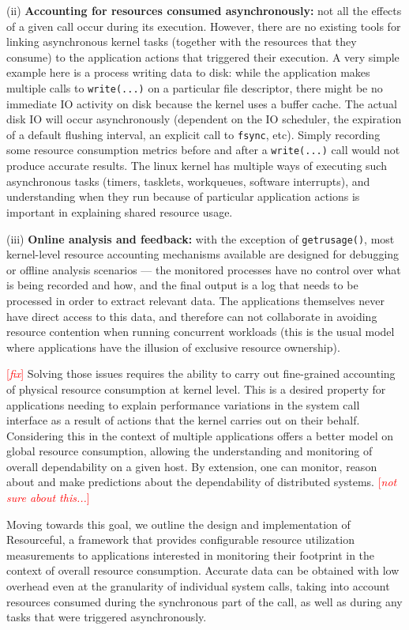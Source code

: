 \documentclass[letterpaper,twocolumn,10pt]{article}
\newcommand{\pname}{Resourceful}
\newcommand{\lnote}[1]{\textcolor{red}{[\textit{#1}]}} %
\begin{document}
(ii) \textbf{Accounting for resources consumed asynchronously:} not all the effects of a given call occur during its execution. However, there are no existing tools for linking asynchronous kernel tasks (together with the resources that they consume) to the application actions that triggered their execution. A very simple example here is a process writing data to disk: while the application makes multiple calls to \texttt{write(...)} on a particular file descriptor, there might be no immediate IO activity on disk because the kernel uses a buffer cache. The actual disk IO will occur asynchronously (dependent on the IO scheduler, the expiration of a default flushing interval, an explicit call to \texttt{fsync}, etc). Simply recording some resource consumption metrics before and after a \texttt{write(...)} call would not produce accurate results. The linux kernel has multiple ways of executing such asynchronous tasks (timers, tasklets, workqueues, software interrupts), and understanding when they run because of particular application actions is important in explaining shared resource usage.

(iii) \textbf{Online analysis and feedback:} with the exception of \texttt{getrusage()}, most kernel-level resource accounting mechanisms available are designed for debugging or offline analysis scenarios --- the monitored processes have no control over what is being recorded and how, and the final output is a log that needs to be processed in order to extract relevant data. The applications themselves never have direct access to this data, and therefore can not collaborate in avoiding resource contention when running concurrent workloads (this is the usual model where applications have the illusion of exclusive resource ownership).

\lnote{fix} Solving those issues requires the ability to carry out fine-grained accounting of physical resource consumption at kernel level. This is a desired property for applications needing to explain performance variations in the system call interface as a result of actions that the kernel carries out on their behalf. Considering this in the context of multiple applications offers a better model on global resource consumption, allowing the understanding and monitoring of overall dependability on a given host. By extension, one can monitor, reason about and make predictions about the dependability of distributed systems. \lnote{not sure about this...} 

Moving towards this goal, we outline the design and implementation of \pname, a framework that provides configurable resource utilization measurements to applications interested in monitoring their footprint in the context of overall resource consumption. Accurate data can be obtained with low overhead even at the granularity of individual system calls, taking into account resources consumed during the synchronous part of the call, as well as during any tasks that were triggered asynchronously. 
\end{document}
